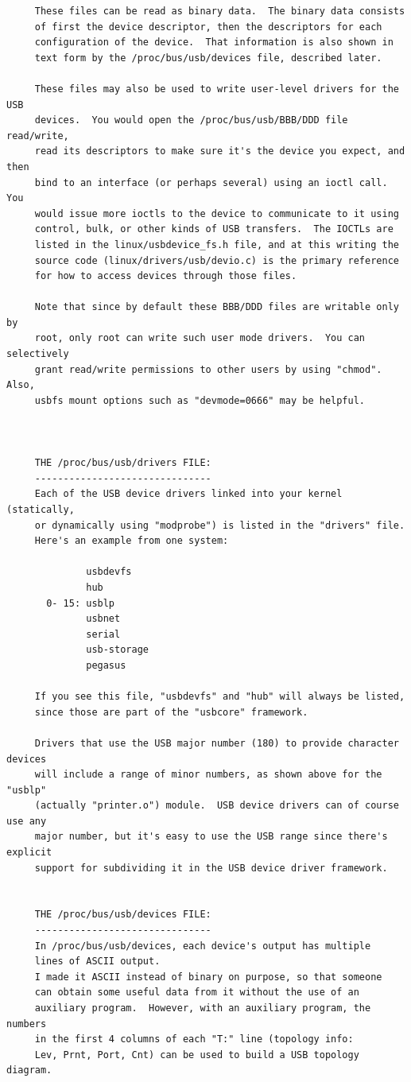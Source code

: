 \begin{verbatim}
     These files can be read as binary data.  The binary data consists
     of first the device descriptor, then the descriptors for each
     configuration of the device.  That information is also shown in
     text form by the /proc/bus/usb/devices file, described later.
     
     These files may also be used to write user-level drivers for the USB
     devices.  You would open the /proc/bus/usb/BBB/DDD file read/write,
     read its descriptors to make sure it's the device you expect, and then
     bind to an interface (or perhaps several) using an ioctl call.  You
     would issue more ioctls to the device to communicate to it using
     control, bulk, or other kinds of USB transfers.  The IOCTLs are
     listed in the linux/usbdevice_fs.h file, and at this writing the
     source code (linux/drivers/usb/devio.c) is the primary reference
     for how to access devices through those files.
     
     Note that since by default these BBB/DDD files are writable only by
     root, only root can write such user mode drivers.  You can selectively
     grant read/write permissions to other users by using "chmod".  Also,
     usbfs mount options such as "devmode=0666" may be helpful.
     
     
     
     THE /proc/bus/usb/drivers FILE:
     -------------------------------
     Each of the USB device drivers linked into your kernel (statically,
     or dynamically using "modprobe") is listed in the "drivers" file.
     Here's an example from one system:
     
              usbdevfs
              hub
       0- 15: usblp
              usbnet
              serial
              usb-storage
              pegasus
     
     If you see this file, "usbdevfs" and "hub" will always be listed,
     since those are part of the "usbcore" framework.
     
     Drivers that use the USB major number (180) to provide character devices
     will include a range of minor numbers, as shown above for the "usblp"
     (actually "printer.o") module.  USB device drivers can of course use any
     major number, but it's easy to use the USB range since there's explicit
     support for subdividing it in the USB device driver framework.
     
     
     THE /proc/bus/usb/devices FILE:
     -------------------------------
     In /proc/bus/usb/devices, each device's output has multiple
     lines of ASCII output.
     I made it ASCII instead of binary on purpose, so that someone
     can obtain some useful data from it without the use of an
     auxiliary program.  However, with an auxiliary program, the numbers
     in the first 4 columns of each "T:" line (topology info:
     Lev, Prnt, Port, Cnt) can be used to build a USB topology diagram.
     

\end{verbatim}
